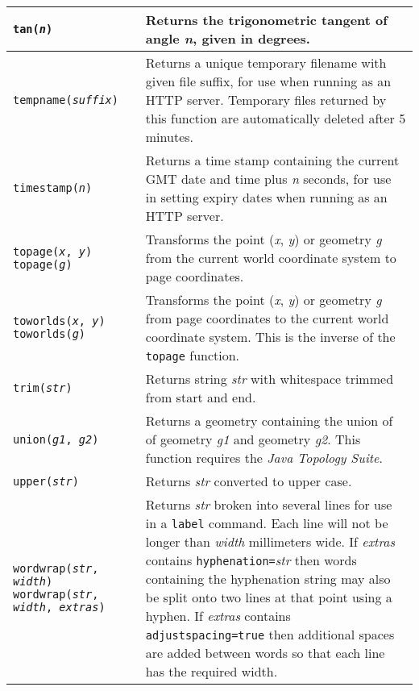 \begin{longtable}{|p{5cm}|p{7cm}|}
\hline

\texttt{tan(\textit{n})} &
Returns the trigonometric tangent of angle \textit{n}, given in degrees. \\

\hline

\texttt{tempname(\textit{suffix})} &
Returns a unique temporary filename with given file suffix,
for use when running as an HTTP server.
Temporary files returned by this function
are automatically deleted after 5 minutes. \\

\hline

\texttt{timestamp(\textit{n})} &
Returns a time stamp containing the current GMT date and time plus
\textit{n} seconds, for use in setting expiry dates when
running as an HTTP server. \\

\hline

\texttt{topage(\textit{x}, \textit{y})}
\texttt{topage(\textit{g})} &
Transforms the point (\textit{x}, \textit{y}) or geometry \textit{g}
from the current world coordinate system to page coordinates. \\

\hline

\texttt{toworlds(\textit{x}, \textit{y})}
\texttt{toworlds(\textit{g})} &
Transforms the point (\textit{x}, \textit{y}) or geometry \textit{g}
from page coordinates to the current world coordinate system.
This is the inverse of the \texttt{topage} function. \\

\hline

\texttt{trim(\textit{str})} &
Returns string \textit{str} with whitespace trimmed from start and end. \\

\hline

\texttt{union(\textit{g1}, \textit{g2})} &
Returns a geometry containing the union of 
of geometry \textit{g1} and geometry \textit{g2}.
This function requires the \textit{Java Topology Suite}. \\

\hline

\texttt{upper(\textit{str})} &
Returns \textit{str} converted to upper case. \\

\hline

\texttt{wordwrap(\textit{str}, \textit{width})}
\texttt{wordwrap(\textit{str}, \textit{width}, \textit{extras})} &
Returns \textit{str} broken into several lines for
use in a \texttt{label} command.
Each line will not be
longer than \textit{width} millimeters wide.
If \textit{extras} contains \texttt{hyphenation=}\textit{str} then
words containing the hyphenation
string may also be split onto two lines at that point using a hyphen.
If \textit{extras} contains \texttt{adjustspacing=true} then
additional spaces are added between words so that each line has the
required width.  \\

\hline
\end{longtable}

